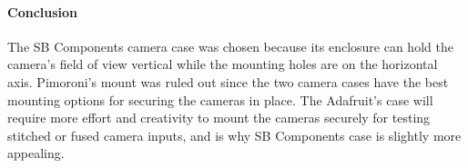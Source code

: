 \paragraph{Conclusion}

The SB Components camera case was chosen because its enclosure can hold the camera's 
field of view vertical while the mounting holes are on the horizontal axis. Pimoroni's
mount was ruled out since the two camera cases have the best mounting options for 
securing the cameras in place. The Adafruit's case will require 
more effort and creativity to mount the cameras securely for testing stitched or 
fused camera inputs, and is why SB Components case is slightly more appealing.\\